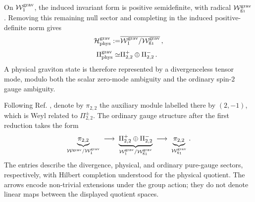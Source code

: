 \documentclass{SciPost}
\begin{document}
On ${\cal W}_1^{\rm grav}$, the induced invariant form is positive semidefinite, with radical ${\cal W}_{{\rm g}_1}^{\rm grav}$. Removing this remaining null sector and completing in the induced positive-definite norm gives
\begin{align}\label{eq:graviton-physical-space}
    {\cal H}_{\rm phys}^{\rm grav}
    :=&
    \overline{
        {\cal W}_1^{\rm grav}/
        {\cal W}_{{\rm g}_1}^{\rm grav}
    } \,,
     \\[3pt]
    \Pi_{\rm phys}^{\rm grav}
    \simeq&
    \Pi_{2,2}^{+}\oplus\Pi_{2,2}^{-} \,.
\end{align}
A physical graviton state is therefore represented by a divergenceless tensor mode, modulo both the scalar zero-mode ambiguity and the ordinary spin-$2$ gauge ambiguity.

Following Ref. \cite{GravGB}, denote by $\pi_{2,2}$ the auxiliary module labelled there by $(2,-1)$, which is Weyl related to $\Pi_{2,2}^{\pm}$. The ordinary gauge structure after the first reduction takes the form
\begin{align}\label{eq:graviton-basic-indec}
    \underbrace{\pi_{2,2}}_{
        {\cal W}^{\rm grav}/{\cal W}_1^{\rm grav}}
    \;\longrightarrow\;
    \underbrace{\Pi_{2,2}^{+}\oplus\Pi_{2,2}^{-}}_{
        {\cal W}_1^{\rm grav}/{\cal W}_{{\rm g}_1}^{\rm grav}}
    \;\longrightarrow\;
    \underbrace{\pi_{2,2}}_{
        {\cal W}_{{\rm g}_1}^{\rm grav}} \,.
\end{align}
The entries describe the divergence, physical, and ordinary pure-gauge sectors, respectively, with Hilbert completion understood for the physical quotient. The arrows encode non-trivial extensions under the group action; they do not denote linear maps between the displayed quotient spaces.
\end{document}
